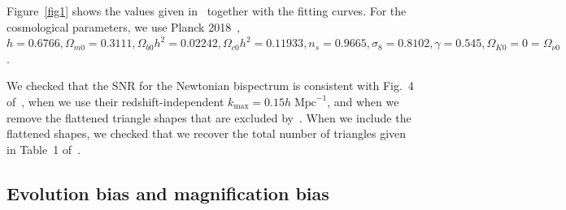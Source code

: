 Figure~\ref{fig1} shows the values given in~\cite{Yankelevich:2018uaz} together with the fitting curves. For the cosmological parameters, we use Planck 2018~\cite{Aghanim:2018eyx},
$h = 0.6766, \Omega_{m0} = 0.3111,
\Omega_{b0}h^{2}= 0.02242,
\Omega_{c0} h^{2} = 0.11933,
n_s = 0.9665,
\sigma_8 = 0.8102, \gamma=0.545,
\Omega_{K0} = 0= \Omega_{\nu 0}$.

We checked that the SNR for the Newtonian bispectrum is consistent with Fig.~4 of~\cite{Yankelevich:2018uaz}, when we use their redshift-independent $k_{\mathrm{max}} = 0.15h\;\mathrm{Mpc}^{-1}$, and when we remove the flattened triangle shapes that are excluded by~\cite{Yankelevich:2018uaz}. When we include the flattened shapes, we checked that we recover the total number of triangles given in Table~1 of~\cite{Oddo:2019run}.
%
%
\subsection{Evolution bias and magnification bias}

